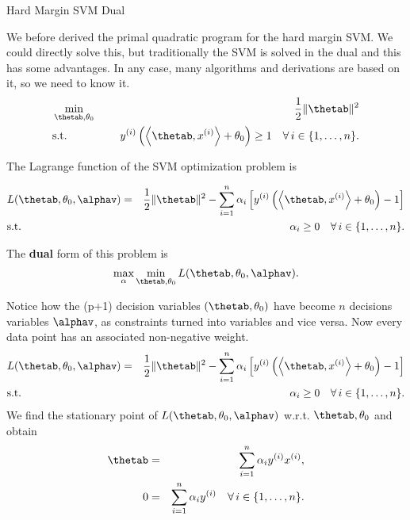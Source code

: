 \begin{vbframe}{Hard Margin SVM Dual}

We before derived the primal quadratic program for the hard margin SVM. We could directly solve this, but traditionally the SVM is solved in the dual and this has some advantages. In any case, many algorithms and derivations are based on it, so we need to know it.
  \begin{eqnarray*}
  & \min\limits_{\thetab, \theta_0} \quad & \frac{1}{2} \|\thetab\|^2 \\
  & \text{s.t.} & \,\,\yi  \left( \scp{\thetab}{\xi} + \theta_0 \right) \geq 1 \quad \forall\, i \in \nset.
\end{eqnarray*}







The Lagrange function of the SVM optimization problem is

\vspace*{-.5cm}

\small
\begin{eqnarray*}
&L(\thetab, \theta_0, \alphav) = & \frac{1}{2}\|\thetab\|^2  -  \sum_{i=1}^n \alpha_i \left[\yi  \left( \scp{\thetab}{\xi} + \theta_0 \right) - 1\right]\\
 & \text{s.t.} & \,\, \alpha_i \ge 0 \quad \forall\, i \in \nset.
\end{eqnarray*}
\small

The \textbf{dual} form of this problem is
$$\max\limits_{\alpha} \min\limits_{\thetab, \theta_0}  L(\thetab, \theta_0,\alphav).$$

\framebreak 

Notice how the (p+1) decision variables $(\thetab,\theta_0)$ have become $n$ decisions variables $\alphav$, as constraints turned into variables and vice versa.
Now every data point has an associated non-negative weight.
\begin{eqnarray*}
&L(\thetab, \theta_0, \alphav) = & \frac{1}{2}\|\thetab\|^2  -  \sum_{i=1}^n \alpha_i \left[\yi  \left( \scp{\thetab}{\xi} + \theta_0 \right) - 1\right]\\
 & \text{s.t.} & \,\, \alpha_i \ge 0 \quad \forall\, i \in \nset.
\end{eqnarray*}
We find the stationary point of $L(\thetab, \theta_0,\alphav)$ w.r.t. $\thetab, \theta_0$ and obtain
\begin{eqnarray*}
    \thetab & = & \sum_{i=1}^n \alpha_i \yi \xi, \\
    0 & = & \sum_{i=1}^n \alpha_i \yi \quad \forall\, i \in \nset.\\
\end{eqnarray*}



\end{vbframe}
